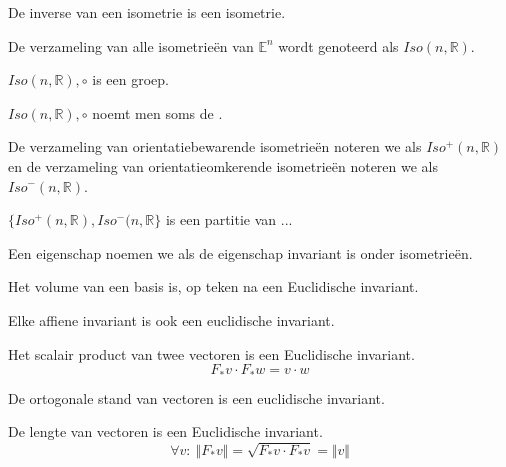 \documentclass[main.tex]{subfiles}
\begin{document}
\begin{st}
  De inverse van een isometrie is een isometrie.
\end{st}

\begin{de}
  De verzameling van alle isometrie\"en van $\mathbb{E}^{n}$ wordt genoteerd als $Iso(n,\mathbb{R})$.
\end{de}

\begin{st}
  $Iso(n,\mathbb{R}),\circ$ is een groep.
\end{st}

\begin{de}
  $Iso(n,\mathbb{R}),\circ$ noemt men soms de .
\end{de}

\begin{de}
  De verzameling van orientatiebewarende isometrie\"en noteren we als $Iso^{+}(n,\mathbb{R})$ en de verzameling van orientatieomkerende isometrie\"en noteren we als $Iso^{-}(n,\mathbb{R})$.
\end{de}

\begin{st}
  $\{ Iso^{+}(n,\mathbb{R}), Iso^{-}(n,\mathbb{R} \}$ is een partitie van ...
\end{st}

\begin{de}
  Een eigenschap noemen we  als de eigenschap invariant is onder isometrie\"en.
\end{de}

\begin{st}
  Het volume van een basis is, op teken na een Euclidische invariant.
\end{st}

\begin{st}
  Elke affiene invariant is ook een euclidische invariant.
\end{st}

\begin{st}
  Het scalair product van twee vectoren is een Euclidische invariant.
\[ F_{*}v \cdot F_{*}w = v \cdot w \]
\end{st}

\begin{st}
  De ortogonale stand van vectoren is een euclidische invariant.
\end{st}

\begin{st}
  De lengte van vectoren is een Euclidische invariant.
\[ \forall v:\ \Vert F_{*}v \Vert = \sqrt{F_{*}v \cdot F_{*}v} = \Vert v \Vert \]
\end{st}
\end{document}
